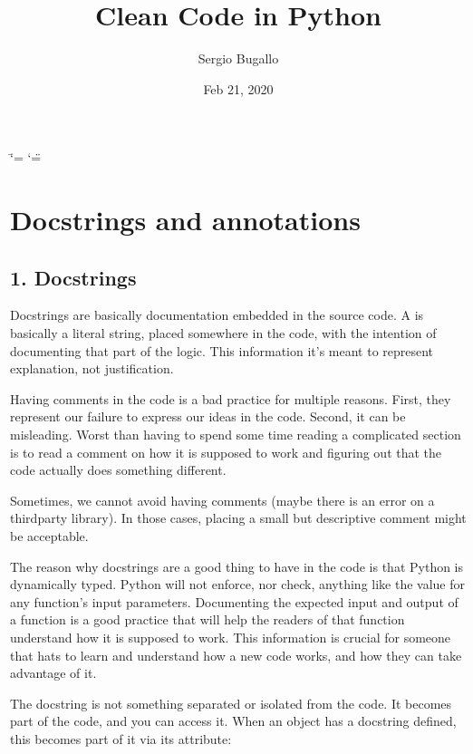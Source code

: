 \documentclass[a4paper,10pt,english]{sphinxmanual}
\title{Clean Code in Python}
\date{Feb 21, 2020}
\author{Sergio Bugallo}
\begin{document}
\ifdefined\shorthandoff
  \ifnum\catcode`\=\string=\active\shorthandoff{=}\fi
  \ifnum\catcode`\"=\active{}\fi
\fi

\pagestyle{empty}
\sphinxmaketitle
\pagestyle{plain}
\sphinxtableofcontents
\pagestyle{normal}
\label{\detokenize{index::doc}}



\chapter{Docstrings and annotations}
\label{\detokenize{chapters/1_docstrings_and_annotations/index:docstrings-and-annotations}}\label{\detokenize{chapters/1_docstrings_and_annotations/index::doc}}

\section{1. Docstrings}
\label{\detokenize{chapters/1_docstrings_and_annotations/index:docstrings}}
Docstrings are basically documentation embedded in the source code. A  is basically a literal
string, placed somewhere in the code, with the intention of documenting that part of the logic. This
information it’s meant to represent explanation, not justification.

Having comments in the code is a bad practice for multiple reasons. First, they represent our failure to
express our ideas in the code. Second, it can be misleading. Worst than having to spend some time reading a
complicated section is to read a comment on how it is supposed to work and figuring out that the code
actually does something different.

Sometimes, we cannot avoid having comments (maybe there is an error on a third\sphinxhyphen{}party library). In those cases,
placing a small but descriptive comment might be acceptable.

The reason why docstrings are a good thing to have in the code is that Python is dynamically typed. Python
will not enforce, nor check, anything like the value for any function’s input parameters. Documenting the
expected input and output of a function is a good practice that will help the readers of that function
understand how it is supposed to work. This information is crucial for someone that hats to learn and
understand how a new code works, and how they can take advantage of it.

The docstring is not something separated or isolated from the code. It becomes part of the code, and you can
access it. When an object has a docstring defined, this becomes part of it via its  attribute:
\end{document}
